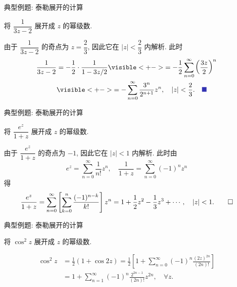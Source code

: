 \begin{frame}{典型例题: 泰勒展开的计算}
\begin{example}
将 $\dfrac1{3z-2}$ 展开成 $z$ 的幂级数.
\end{example}
\begin{solutions}
由于 $\dfrac1{3z-2}$ 的奇点为 $z=\dfrac23$, 因此它在 $|z|<\dfrac23$ 内解析.
\onslide<+->
此时
\begin{align*}
\frac1{3z-2}&=-\frac12\cdot\frac1{1-3z/2}
\visible<+->{=-\frac12\sum_{n=0}^\infty\left(\frac{3z}2\right)^n}\\
&\visible<+->{=-\sum_{n=0}^\infty\frac{3^n}{2^{n+1}}z^n,\quad|z|<\frac23.\mqed}
\end{align*}
\end{solutions}
\end{frame}


\begin{frame}{典型例题: 泰勒展开的计算}
\begin{example}
将 $\dfrac{e^z}{1+z}$ 展开成 $z$ 的幂级数.
\end{example}
\begin{solution}
由于 $\dfrac{e^z}{1+z}$ 的奇点为 $-1$, 因此它在 $|z|<1$ 内解析.
\onslide<+->
此时由
\[e^z=\sum_{n=0}^\infty\frac1{n!}z^n,\quad
\frac1{1+z}=\sum_{n=0}^\infty(-1)^nz^n\]
\onslide<+->
得
\[\dfrac{e^z}{1+z}=\sum_{n=0}^\infty\left[\sum_{k=0}^n\frac{(-1)^{n-k}}{k!}\right]z^n
=1+\frac12z^2-\frac13z^3+\cdots,\quad|z|<1.\qedhere\]
\vspace{-\baselineskip}
\end{solution}
\end{frame}


\begin{frame}{典型例题: 泰勒展开的计算}
\begin{exercise}
将 $\cos^2z$ 展开成 $z$ 的幂级数.
\end{exercise}
\vspace{-0.3\baselineskip}
\begin{answer}
\vspace{-\baselineskip}
\begin{align*}
\cos^2z&=\frac12(1+\cos{2z})=\frac12\left[1+\sum_{n=0}^\infty(-1)^n\frac{(2z)^{2n}}{(2n)!}\right]\\
&=1+\sum_{n=1}^\infty(-1)^n\frac{2^{2n-1}}{(2n)!}z^{2n},\quad\forall z.
\end{align*}
\end{answer}
\end{frame}


